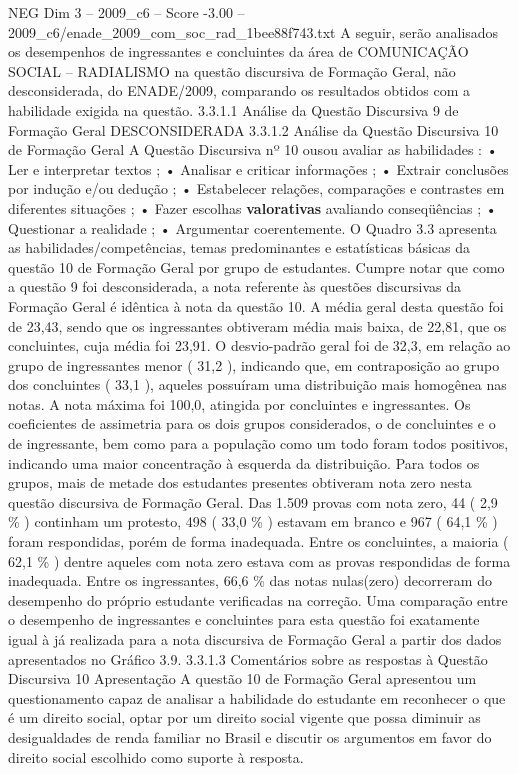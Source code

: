 \begin{textsample}{NEG Dim 3 – 2009\_c6 – Score -3.00 – 2009\_c6/enade\_2009\_com\_soc\_rad\_1bee88f743.txt}
A seguir, serão analisados os desempenhos de ingressantes e concluintes da área de COMUNICAÇÃO SOCIAL – RADIALISMO na questão discursiva de Formação Geral, não desconsiderada, do ENADE/2009, comparando os resultados obtidos com a habilidade exigida na questão. 3.3.1.1 Análise da Questão Discursiva 9 de Formação Geral DESCONSIDERADA 3.3.1.2 Análise da Questão Discursiva 10 de Formação Geral A Questão Discursiva nº 10 ousou avaliar as habilidades : • Ler e interpretar textos ; • Analisar e criticar informações ; • Extrair conclusões por indução e/ou dedução ; • Estabelecer relações, comparações e contrastes em diferentes situações ; • Fazer escolhas \textbf{valorativas} avaliando conseqüências ; • Questionar a realidade ; • Argumentar coerentemente.
O Quadro 3.3 apresenta as habilidades/competências, temas predominantes e estatísticas básicas da questão 10 de Formação Geral por grupo de estudantes.
Cumpre notar que como a questão 9 foi desconsiderada, a nota referente às questões discursivas da Formação Geral é idêntica à nota da questão 10.
A média geral desta questão foi de 23,43, sendo que os ingressantes obtiveram média mais baixa, de 22,81, que os concluintes, cuja média foi 23,91.
O desvio-padrão geral foi de 32,3, em relação ao grupo de ingressantes menor ( 31,2 ), indicando que, em contraposição ao grupo dos concluintes ( 33,1 ), aqueles possuíram uma distribuição mais homogênea nas notas.
A nota máxima foi 100,0, atingida por concluintes e ingressantes.
Os coeficientes de assimetria para os dois grupos considerados, o de concluintes e o de ingressante, bem como para a população como um todo foram todos positivos, indicando uma maior concentração à esquerda da distribuição.
Para todos os grupos, mais de metade dos estudantes presentes obtiveram nota zero nesta questão discursiva de Formação Geral.
Das 1.509 provas com nota zero, 44 ( 2,9 \% ) continham um protesto, 498 ( 33,0 \% ) estavam em branco e 967 ( 64,1 \% ) foram respondidas, porém de forma inadequada.
Entre os concluintes, a maioria ( 62,1 \% ) dentre aqueles com nota zero estava com as provas respondidas de forma inadequada.
Entre os ingressantes, 66,6 \% das notas nulas(zero) decorreram do desempenho do próprio estudante verificadas na correção.
Uma comparação entre o desempenho de ingressantes e concluintes para esta questão foi exatamente igual à já realizada para a nota discursiva de Formação Geral a partir dos dados apresentados no Gráfico 3.9. 3.3.1.3 Comentários sobre as respostas à Questão Discursiva 10 Apresentação A questão 10 de Formação Geral apresentou um questionamento capaz de analisar a habilidade do estudante em reconhecer o que é um direito social, optar por um direito social vigente que possa diminuir as desigualdades de renda familiar no Brasil e discutir os argumentos em favor do direito social escolhido como suporte à resposta.

\end{textsample}
